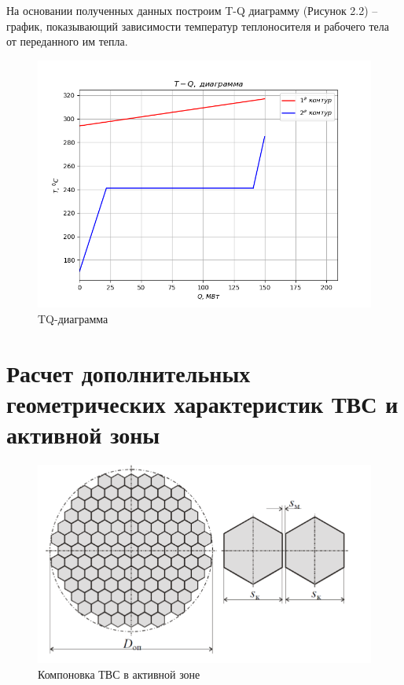 На основании полученных данных построим T-Q диаграмму (Рисунок 2.2) --
график, показывающий зависимости температур теплоносителя и рабочего
тела от переданного им тепла.

\begin{figure}[!h]
\center
\includegraphics[width=16cm]{media/image7.png}
\caption{TQ-диаграмма}
\end{figure}

\section{Расчет дополнительных геометрических характеристик ТВС и
активной зоны}

\begin{figure}[!h]
\center
\includegraphics[width=14cm]{media/image8.png}
\caption{Компоновка ТВС в активной зоне \cite{deev}}
\end{figure}


